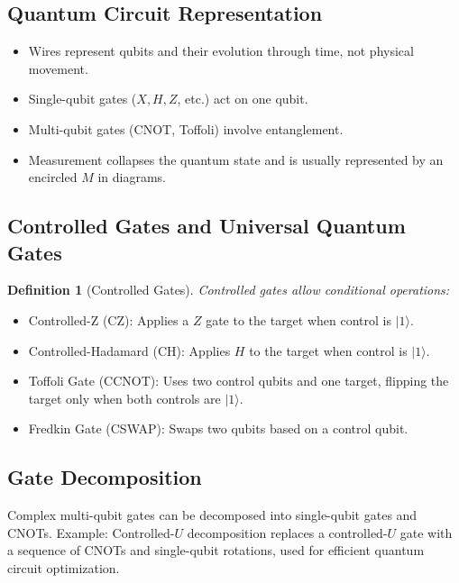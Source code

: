 \documentclass{article}
\newtheorem{definition}[theorem]{Definition}
\begin{document}
\subsection{Quantum Circuit Representation}
\begin{itemize}
    \item Wires represent qubits and their evolution through time, not physical movement.
    \item Single-qubit gates (\(X, H, Z\), etc.) act on one qubit.
    \item Multi-qubit gates (CNOT, Toffoli) involve entanglement.
    \item Measurement collapses the quantum state and is usually represented by an encircled \(M\) in diagrams.
\end{itemize}

\subsection{Controlled Gates and Universal Quantum Gates}
\begin{definition}[Controlled Gates]
Controlled gates allow conditional operations:
\end{definition}

\begin{itemize}
    \item Controlled-Z (CZ): Applies a \(Z\) gate to the target when control is \(|1\rangle\).
    \item Controlled-Hadamard (CH): Applies \(H\) to the target when control is \(|1\rangle\).
    \item Toffoli Gate (CCNOT): Uses two control qubits and one target, flipping the target only when both controls are \(|1\rangle\).
    \item Fredkin Gate (CSWAP): Swaps two qubits based on a control qubit.
\end{itemize}

\subsection{Gate Decomposition}
\begin{conceptbox}
Complex multi-qubit gates can be decomposed into single-qubit gates and CNOTs. Example: Controlled-\(U\) decomposition replaces a controlled-\(U\) gate with a sequence of CNOTs and single-qubit rotations, used for efficient quantum circuit optimization.
\end{conceptbox}
\end{document}
